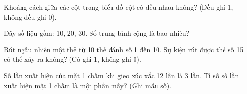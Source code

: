 \begin{ex}
Khoảng cách giữa các cột trong biểu đồ cột có đều nhau không? (Đều ghi 1, không đều ghi 0).
\end{ex}

\begin{ex}
Dãy số liệu gồm: 10, 20, 30. Số trung bình cộng là bao nhiêu?
\end{ex}

\begin{ex}
Rút ngẫu nhiên một thẻ từ 10 thẻ đánh số 1 đến 10. Sự kiện rút được thẻ số 15 có thể xảy ra không? (Có ghi 1, không ghi 0).
\end{ex}

\begin{ex}
Số lần xuất hiện của mặt 1 chấm khi gieo xúc xắc 12 lần là 3 lần. Tỉ số số lần xuất hiện mặt 1 chấm là một phần mấy? (Ghi mẫu số).
\end{ex}
